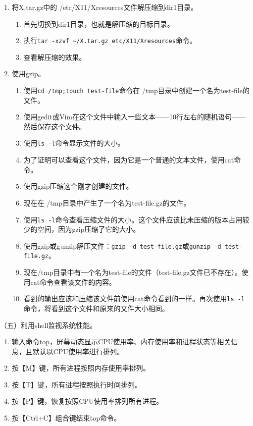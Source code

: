 \begin{enumerate}
\begin{enumerate}
    \end{enumerate}
  \item 将X.tar.gz中的 /etc/X11/Xresources文件解压缩到dir1目录。
    \begin{enumerate}
      \item 首先切换到dir1目录，也就是解压缩的目标目录。
      \item 执行\verb|tar -xzvf ~/X.tar.gz etc/X11/Xresources|命令。
      \item 查看解压缩的效果。
    \end{enumerate}
  \item 使用gzip。
    \begin{enumerate}
      \item 使用\verb|cd /tmp;touch test-file|命令在 /tmp目录中创建一个名为test-file的文件。
      \item 使用gedit或Vim在这个文件中输入一些文本——10行左右的随机语句——然后保存这个文件。
      \item 使用\verb|ls -l|命令显示文件的大小。
      \item 为了证明可以查看这个文件，因为它是一个普通的文本文件，使用cat命令。
      \item 使用gzip压缩这个刚才创建的文件。
      \item 现在在 /tmp目录中产生了一个名为test-file.gz的文件。
      \item 使用\verb|ls -l|命令查看压缩文件的大小。这个文件应该比未压缩的版本占用较少的空间，因为gzip压缩了它的大小。
      \item 使用gzip或gunzip解压文件：\verb|gzip -d test-file.gz|或\verb|gunzip -d test-file.gz|。
      \item 现在/tmp目录中有一个名为test-file的文件（test-file.gz文件已不存在）。使用cat命令查看该文件的内容。
      \item 看到的输出应该和压缩该文件前使用cat命令看到的一样。再次使用\verb|ls -l|命令，将看到这个文件和原来的文件大小相同。
    \end{enumerate}
\end{enumerate}

\vspace{0.1in}
（五）利用shell监视系统性能。
\begin{enumerate}
  \item 输入命令top，屏幕动态显示CPU使用率、内存使用率和进程状态等相关信息，且默认以CPU使用率进行排列。
  \item 按【M】键，所有进程按照内存使用率排列。
  \item 按【T】键，所有进程按照执行时间排列。
  \item 按【P】键，恢复按照CPU使用率排列所有进程。
  \item 按【Ctrl+C】组合键结束top命令。
\end{enumerate}


